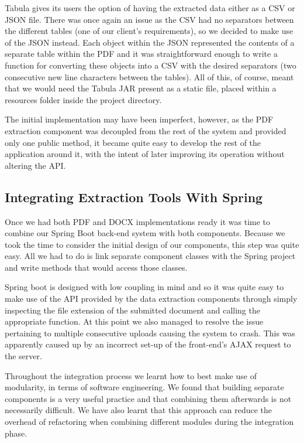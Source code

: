 \documentclass{l3proj}
\begin{document}
Tabula gives its users the option of having the extracted data either as a CSV or JSON file. There was once again an issue as the CSV had no separators between the different tables (one of our client's requirements), so we decided to make use of the JSON instead. Each object within the JSON represented the contents of a separate table within the PDF and it was straightforward enough to write a function for converting these objects into a CSV with the desired separators (two consecutive new line characters between the tables). All of this, of course, meant that we would need the Tabula JAR present as a static file, placed within a resources folder inside the project directory.

The initial implementation may have been imperfect, however, as the PDF extraction component was decoupled from the rest of the system and provided only one public method, it became quite easy to develop the rest of the application around it, with the intent of later improving its operation without altering the API.

\subsection{Integrating Extraction Tools With Spring}
\label{sec:spring_intg}
Once we had both PDF and DOCX implementations ready it was time to combine our Spring Boot back-end system with both components. Because we took the time to consider the initial design \cite{Design-considerations} of our components, this step was quite easy. All we had to do is link separate component classes with the Spring project and write methods that would access those classes. 

Spring boot is designed with low coupling in mind and so it was quite easy to make use of the API provided by the data extraction components through simply inspecting the file extension of the submitted document and calling the appropriate function. At this point we also managed to resolve the issue pertaining to multiple consecutive uploads causing the system to crash. This was apparently caused up by an incorrect set-up of the front-end's AJAX request to the server.

Throughout the integration process we learnt how to best make use of modularity, in terms of software engineering. We found that building separate components is a very useful practice and that combining them afterwards is not necessarily difficult. We have also learnt that this approach can reduce the overhead of refactoring when combining different modules during the integration phase.
\end{document}
